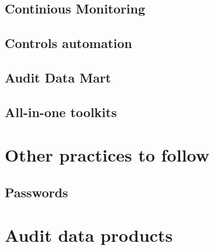 \documentclass[
]{book}
\begin{document}
\hypertarget{continious-monitoring}{%
\section{Continious Monitoring}\label{continious-monitoring}}

\hypertarget{controls-automation}{%
\section{Controls automation}\label{controls-automation}}

\hypertarget{audit-data-mart}{%
\section{Audit Data Mart}\label{audit-data-mart}}

\hypertarget{all-in-one-toolkits}{%
\section{All-in-one toolkits}\label{all-in-one-toolkits}}

\hypertarget{other-practices-to-follow}{%
\chapter{Other practices to follow}\label{other-practices-to-follow}}

\hypertarget{passwords}{%
\section{Passwords}\label{passwords}}

\hypertarget{section}{%
\section{}\label{section}}

\hypertarget{audit-data-products}{%
\chapter{Audit data products}\label{audit-data-products}}

  
\end{document}

